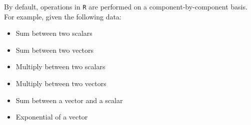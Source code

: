 \documentclass[a4paper]{article}
\begin{document}
    By default, operations in \texttt{R} are performed on a component-by-component basis. For example, given the following data:
    
    \begin{itemize}
        \item Sum between two scalars
        

        \item Sum between two vectors
        

        \item Multiply between two scalars
        

        \item Multiply between two vectors
        

        \item Sum between a vector and a scalar
        

        \item Exponential of a vector
        
    \end{itemize}


















    \newpage

    {}
    

    \newpage

    \printindex
\end{document}
